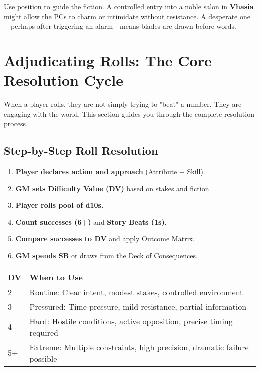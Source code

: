 Use position to guide the fiction. A controlled entry into a noble salon in \textbf{Vhasia} might allow the PCs to charm or intimidate without resistance. A desperate one---perhaps after triggering an alarm---means blades are drawn before words.

\section{Adjudicating Rolls: The Core Resolution Cycle}

When a player rolls, they are not simply trying to "beat" a number. They are engaging with the world. This section guides you through the complete resolution process.

\subsection{Step-by-Step Roll Resolution}

\begin{enumerate}
    \item \textbf{Player declares action and approach} (Attribute + Skill).
    \item \textbf{GM sets Difficulty Value (DV)} based on stakes and fiction.
    \item \textbf{Player rolls pool of d10s.}
    \item \textbf{Count successes (6+)} and \textbf{Story Beats (1s)}.
    \item \textbf{Compare successes to DV} and apply Outcome Matrix.
    \item \textbf{GM spends SB} or draws from the Deck of Consequences.
\end{enumerate}

\begin{fatebox}
\begin{tabularx}{\textwidth}{lX}
\toprule
\textbf{DV} & \textbf{When to Use} \\
\midrule
2 & Routine: Clear intent, modest stakes, controlled environment \\
3 & Pressured: Time pressure, mild resistance, partial information \\
4 & Hard: Hostile conditions, active opposition, precise timing required \\
5+ & Extreme: Multiple constraints, high precision, dramatic failure possible \\
\bottomrule
\end{tabularx}
\end{fatebox}

